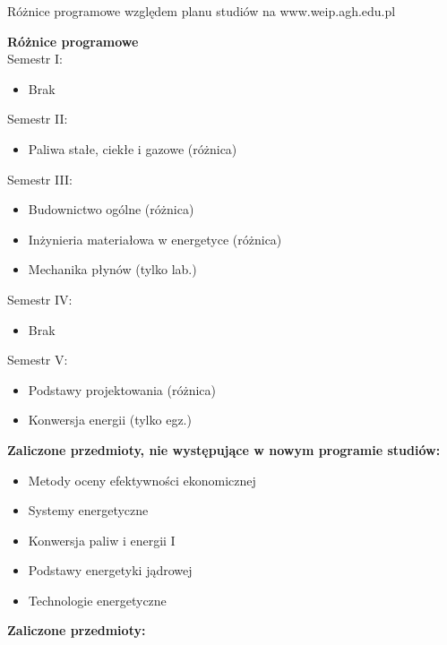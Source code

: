 \documentclass[a4paper,12pt]{article}
\begin{document}
\begin{center}
\Large{Różnice programowe względem planu studiów na www.weip.agh.edu.pl}
\end{center}
\vspace{20pt}
\textbf{Różnice programowe}\\
Semestr I:
\begin{itemize}
\item Brak
\end{itemize}
Semestr II:
\begin{itemize}
\item Paliwa stałe, ciekłe i gazowe (różnica)
\end{itemize}
Semestr III:
\begin{itemize}
\item Budownictwo ogólne (różnica)
\item Inżynieria materiałowa w energetyce (różnica)
\item Mechanika płynów (tylko lab.)
\end{itemize}
Semestr IV:
\begin{itemize}
\item Brak
\end{itemize}
Semestr V:
\begin{itemize}
\item Podstawy projektowania (różnica)
\item Konwersja energii (tylko egz.)
\end{itemize}
\vspace{20pt}
\textbf{Zaliczone przedmioty, nie występujące w nowym programie studiów:}
\begin{itemize}
\item Metody oceny efektywności ekonomicznej
\item Systemy energetyczne
\item Konwersja paliw i energii I
\item Podstawy energetyki jądrowej
\item Technologie energetyczne
\end{itemize}
\newpage
\textbf{Zaliczone przedmioty:}
\end{document}
